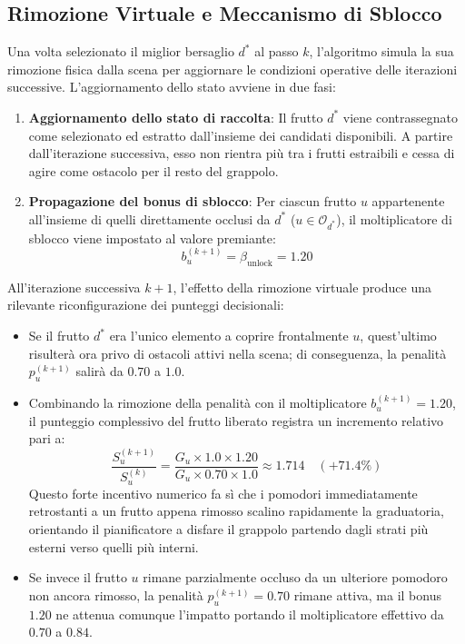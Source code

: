\subsection{Rimozione Virtuale e Meccanismo di Sblocco}
\label{subsec:sblocco_dinamico}

Una volta selezionato il miglior bersaglio $d^*$ al passo $k$, l'algoritmo simula la sua rimozione fisica dalla scena per aggiornare le condizioni operative delle iterazioni successive. L'aggiornamento dello stato avviene in due fasi:
\begin{enumerate}
    \item \textbf{Aggiornamento dello stato di raccolta}: Il frutto $d^*$ viene contrassegnato come selezionato ed estratto dall'insieme dei candidati disponibili. A partire dall'iterazione successiva, esso non rientra più tra i frutti estraibili e cessa di agire come ostacolo per il resto del grappolo.
    \item \textbf{Propagazione del bonus di sblocco}: Per ciascun frutto $u$ appartenente all'insieme di quelli direttamente occlusi da $d^*$ ($u \in \mathcal{O}_{d^*}$), il moltiplicatore di sblocco viene impostato al valore premiante:
    \begin{equation}
        b_u^{(k+1)} = \beta_{\text{unlock}} = 1.20
        \label{eq:bonus_unlock}
    \end{equation}
\end{enumerate}

All'iterazione successiva $k+1$, l'effetto della rimozione virtuale produce una rilevante riconfigurazione dei punteggi decisionali:
\begin{itemize}
    \item Se il frutto $d^*$ era l'unico elemento a coprire frontalmente $u$, quest'ultimo risulterà ora privo di ostacoli attivi nella scena; di conseguenza, la penalità $p_u^{(k+1)}$ salirà da $0.70$ a $1.0$.
    \item Combinando la rimozione della penalità con il moltiplicatore $b_u^{(k+1)} = 1.20$, il punteggio complessivo del frutto liberato registra un incremento relativo pari a:
    \begin{equation}
        \frac{S_u^{(k+1)}}{S_u^{(k)}} = \frac{G_u \times 1.0 \times 1.20}{G_u \times 0.70 \times 1.0} \approx 1.714 \quad (+71.4\%)
        \label{eq:salto_score}
    \end{equation}
    Questo forte incentivo numerico fa sì che i pomodori immediatamente retrostanti a un frutto appena rimosso scalino rapidamente la graduatoria, orientando il pianificatore a disfare il grappolo partendo dagli strati più esterni verso quelli più interni.
    \item Se invece il frutto $u$ rimane parzialmente occluso da un ulteriore pomodoro non ancora rimosso, la penalità $p_u^{(k+1)} = 0.70$ rimane attiva, ma il bonus $1.20$ ne attenua comunque l'impatto portando il moltiplicatore effettivo da $0.70$ a $0.84$.
\end{itemize}

